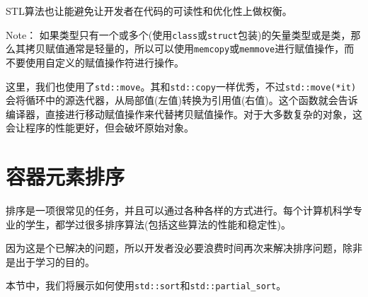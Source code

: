 STL算法也让能避免让开发者在代码的可读性和优化性上做权衡。

\begin{myInfoBox}
Note： 如果类型只有一个或多个(使用\texttt{class}或\texttt{struct}包装)的矢量类型或是类，那么其拷贝赋值通常是轻量的，所以可以使用\texttt{memcopy}或\texttt{memmove}进行赋值操作，而不要使用自定义的赋值操作符进行操作。
\end{myInfoBox}

这里，我们也使用了\texttt{std::move}。其和\texttt{std::copy}一样优秀，不过\texttt{std::move(*it)}会将循环中的源迭代器，从局部值(左值)转换为引用值(右值)。这个函数就会告诉编译器，直接进行移动赋值操作来代替拷贝赋值操作。对于大多数复杂的对象，这会让程序的性能更好，但会破坏原始对象。


\section{容器元素排序}

排序是一项很常见的任务，并且可以通过各种各样的方式进行。每个计算机科学专业的学生，都学过很多排序算法(包括这些算法的性能和稳定性)。

因为这是个已解决的问题，所以开发者没必要浪费时间再次来解决排序问题，除非是出于学习的目的。


本节中，我们将展示如何使用\texttt{std::sort}和\texttt{std::partial\_sort}。

